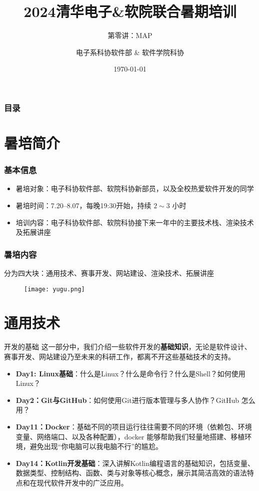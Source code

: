 \documentclass{beamer}
\title{2024清华电子\&软院联合暑期培训}
\subtitle{第零讲：MAP}
\author{电子系科协软件部 \& 软件学院科协}
\date{\today}
\begin{document}
	\titlepage
	
	\begin{frame}
        \frametitle{目录}
        \tableofcontents
    \end{frame}

    \section{暑培简介}

    \begin{frame}
        \frametitle{基本信息}
        \begin{itemize}
            \item 暑培对象：电子科协软件部、软院科协新部员，以及全校热爱软件开发的同学
            \item 暑培时间：7.20--8.07，每晚19:30开始，持续 $2\sim3$ 小时
            \item 培训内容：电子科协软件部、软院科协接下来一年中的主要技术栈、渲染技术及拓展讲座
        \end{itemize}
    \end{frame}

    \begin{frame}
        \frametitle{暑培内容}
        分为四大块：通用技术、赛事开发、网站建设、渲染技术、拓展讲座
        \begin{figure}[H]
            \centering
            \texttt{[image: yugu.png]}
        \end{figure}
    \end{frame}

    \section{通用技术}

    \begin{frame}{开发的基础}
        这一部分中，我们介绍一些软件开发的\textbf{基础知识}，无论是软件设计、赛事开发、网站建设乃至未来的科研工作，都离不开这些基础技术的支持。
        \begin{itemize}
            \item \textbf{Day1: Linux基础}：什么是Linux？什么是命令行？什么是Shell？如何使用Linux？
            \item \textbf{Day2：Git与GitHub}：如何使用Git进行版本管理与多人协作？GitHub 怎么用？
            \item \textbf{Day11：Docker}：基础不同的项目运行往往需要不同的环境（依赖包、环境变量、网络端口、以及各种配置），docker 能够帮助我们轻量地搭建、移植环境，避免出现“你电脑可以我电脑不行”的尴尬。
            \item \textbf{Day14：Kotlin开发基础}：深入讲解Kotlin编程语言的基础知识，包括变量、数据类型、控制结构、函数、类与对象等核心概念，展示其简洁高效的语法特点和在现代软件开发中的广泛应用。
        \end{itemize}
    \end{frame}
\end{document}
